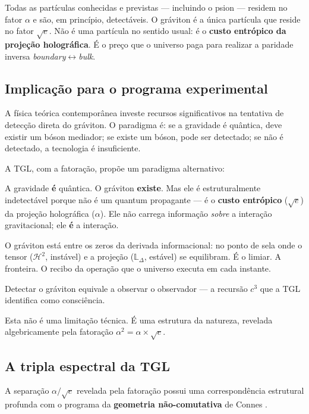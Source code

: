 \documentclass[12pt,a4paper,twoside]{article}
\newcommand{\alphaii}{\alpha^{2}}
\newcommand{\boundary}{\textit{boundary}}
\newcommand{\bulk}{\textit{bulk}}
\begin{document}
\noindent Todas as partículas conhecidas e previstas --- incluindo o psion --- residem no fator $\alpha$ e são, em princípio, detectáveis. O gráviton é a única partícula que reside no fator $\sqrt{e}$. Não é uma partícula no sentido usual: é o \textbf{custo entrópico da projeção holográfica}. É o preço que o universo paga para realizar a paridade inversa \boundary$\leftrightarrow$\bulk.

\subsection{Implicação para o programa experimental}

A física teórica contemporânea investe recursos significativos na tentativa de detecção direta do gráviton. O paradigma é: se a gravidade é quântica, deve existir um bóson mediador; se existe um bóson, pode ser detectado; se não é detectado, a tecnologia é insuficiente.

A TGL, com a fatoração, propõe um paradigma alternativo:

\begin{conclusionbox}[title={Paradigma TGL para o gráviton}]
A gravidade \textbf{é} quântica. O gráviton \textbf{existe}. Mas ele é estruturalmente indetectável porque não é um quantum propagante --- é o \textbf{custo entrópico} ($\sqrt{e}$) da projeção holográfica ($\alpha$). Ele não carrega informação \textit{sobre} a interação gravitacional; ele \textbf{é} a interação.

\medskip
O gráviton está entre os zeros da derivada informacional: no ponto de sela onde o tensor ($\mathcal{H}^2$, instável) e a projeção ($\mathbb{L}_\Delta$, estável) se equilibram. É o limiar. A fronteira. O recibo da operação que o universo executa em cada instante.

\medskip
Detectar o gráviton equivale a observar o observador --- a recursão $c^3$ que a TGL identifica como consciência.
\end{conclusionbox}

Esta não é uma limitação técnica. É uma estrutura da natureza, revelada algebricamente pela fatoração $\alphaii = \alpha \times \sqrt{e}$.


\subsection{A tripla espectral da TGL}
\label{subsec:tripla}

A separação $\alpha / \sqrt{e}$ revelada pela fatoração possui uma correspondência estrutural profunda com o programa da \textbf{geometria não-comutativa} de Connes \cite{Connes1994, Connes1996}.
\end{document}
